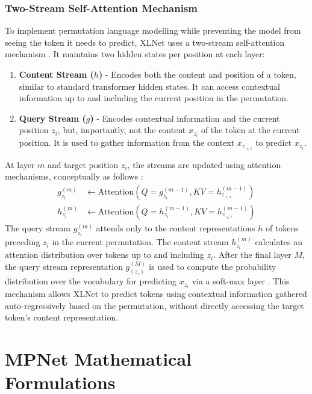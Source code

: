 \documentclass[10pt,oneside]{report}
\begin{document}
\subsubsection*{Two-Stream Self-Attention Mechanism}\label{sec:twostream}
To implement permutation language modelling while preventing the model from seeing the token it needs to predict, XLNet uses a two-stream self-attention mechanism \cite{vaswani2017attention, yang2019xlnet}. It maintains two hidden states per position at each layer:
\begin{enumerate}
    \item \textbf{Content Stream ($h$)} - Encodes both the content and position of a token, similar to standard transformer hidden states. It can access contextual information up to and including the current position in the permutation.
    \item \textbf{Query Stream ($g$)} - Encodes contextual information and the current position $z_i$, but, importantly, not the content $x_{z_i}$ of the token at the current position. It is used to gather information from the context $x_{z_{<i}}$ to predict $x_{z_i}$.
\end{enumerate}
At layer $m$ and target position $z_i$, the streams are updated using attention mechanisms, conceptually as follows \cite{vaswani2017attention, yang2019xlnet}:
\begin{align}
    g_{z_i}^{(m)} &\leftarrow \text{Attention} (Q = g_{z_i}^{(m - 1)}, KV = h_{z_{<i}}^{(m - 1)}) \label{eq:xlnet_g_update_appendix} \\ %
    h_{z_i}^{(m)} &\leftarrow \text{Attention} (Q = h_{z_i}^{(m - 1)}, KV = h_{z_{\le i}}^{(m - 1)}) \label{eq:xlnet_h_update_appendix} %
\end{align}
The query stream $g_{z_i}^{(m)}$ attends only to the content representations $h$ of tokens preceding $z_i$ in the current permutation. The content stream $h_{z_i}^{(m)}$ calculates an attention distribution over tokens up to and including $z_i$. After the final layer $M$, the query stream representation $g_{(z_i)}^{(M)}$ is used to compute the probability distribution over the vocabulary for predicting $x_{z_i}$ via a soft-max layer \cite{gao2017properties, yang2019xlnet}. This mechanism allows XLNet to predict tokens using contextual information gathered auto-regressively based on the permutation, without directly accessing the target token's content representation.

\section{MPNet Mathematical Formulations} \label{app:mpnet_maths}
\end{document}
